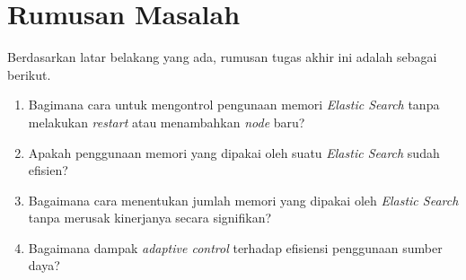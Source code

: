 \section{Rumusan Masalah}

Berdasarkan latar belakang yang ada, rumusan tugas akhir ini adalah sebagai berikut.
\begin{enumerate}
    \item Bagimana cara untuk mengontrol pengunaan memori \textit{Elastic Search} tanpa melakukan \textit{restart} atau menambahkan \textit{node} baru?
    \item Apakah penggunaan memori yang dipakai oleh suatu \textit{Elastic Search} sudah efisien?
    \item Bagaimana cara menentukan jumlah memori yang dipakai oleh \textit{Elastic Search} tanpa merusak kinerjanya secara signifikan?
    \item Bagaimana dampak \textit{adaptive control} terhadap efisiensi penggunaan sumber daya?
\end{enumerate}
